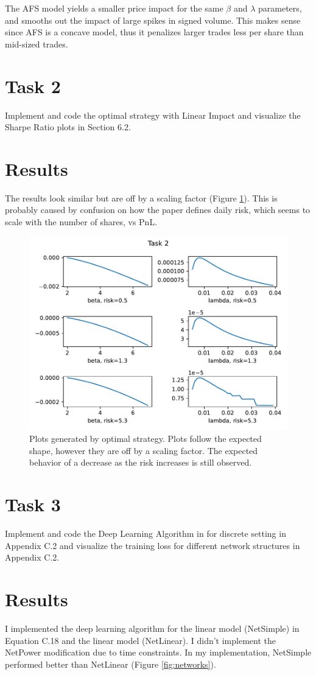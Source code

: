 \documentclass{article}
\begin{document}
	The AFS model yields a smaller price impact for the same $\beta$ and $\lambda$ parameters, and smooths out the impact of large spikes in signed volume. This makes sense since AFS is a concave model, thus it penalizes larger trades less per share than mid-sized trades.
	
	\section{Task 2}
	Implement and code the optimal strategy with Linear Impact and visualize the Sharpe Ratio
	plots in Section 6.2.
	\vspace{-1em}
	\section*{Results}
	The results look similar but are off by a scaling factor (Figure \ref{fig:task2}). This is probably caused by confusion on how the paper defines daily risk, which seems to scale with the number of shares, vs PnL.
	
	\begin{figure}[h]
		\centering
		\includegraphics[width=0.6\linewidth]{figures/task2.pdf}
		\caption{Plots generated by optimal strategy. Plots follow the expected shape, however they are off by a scaling factor. The expected behavior of a decrease as the risk increases is still observed.}
		\label{fig:task2}
	\end{figure}
	
	\section{Task 3}
	Implement and code the Deep Learning Algorithm in for discrete setting in Appendix C.2 and visualize the training loss for different network structures in Appendix C.2.
	\vspace{-1em}
	\section*{Results}
	I implemented the deep learning algorithm for the linear model (NetSimple) in Equation C.18 and the linear model (NetLinear). I didn't implement the NetPower modification due to time constraints. In my implementation, NetSimple performed better than NetLinear (Figure \ref{fig:networks}).
	
\end{document}
